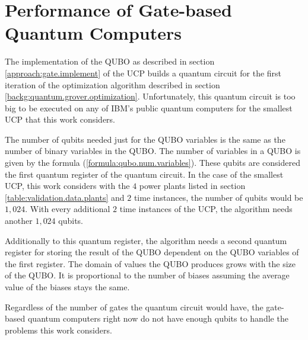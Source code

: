 \section{Performance of Gate-based Quantum Computers}

The implementation of the QUBO as described in section \ref{approach:gate.implement} of the UCP builds a quantum circuit for the first iteration of the optimization algorithm described in section \ref{backg:quantum.grover.optimization}.
Unfortunately, this quantum circuit is too big to be executed on any of IBM's public quantum computers for the smallest UCP that this work considers.

The number of qubits needed just for the QUBO variables is the same as the number of binary variables in the QUBO.
The number of variables in a QUBO is given by the formula (\ref{formula:qubo.num.variables}).
These qubits are considered the first quantum register of the quantum circuit.
In the case of the smallest UCP, this work considers with the $4$ power plants listed in section \ref{table:validation.data.plants} and $2$ time instances, the number of qubits would be $1, 024$.
With every additional $2$ time instances of the UCP, the algorithm needs another $1, 024$ qubits.

Additionally to this quantum register, the algorithm needs a second quantum register for storing the result of the QUBO dependent on the QUBO variables of the first register.
The domain of values the QUBO produces grows with the size of the QUBO.
It is proportional to the number of biases assuming the average value of the biases stays the same.

Regardless of the number of gates the quantum circuit would have, the gate-based quantum computers right now do not have enough qubits to handle the problems this work considers.
